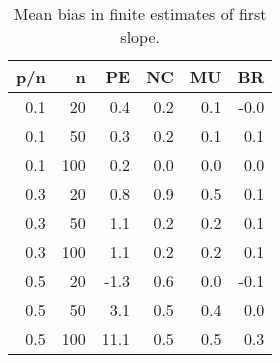 \begin{table}[ht]
\centering
\begin{tabular}{rrrrrr}
  \hline
p/n & n & PE & NC & MU & BR \\ 
  \hline
0.1 & 20 & 0.4 & 0.2 & 0.1 & -0.0 \\ 
  0.1 & 50 & 0.3 & 0.2 & 0.1 & 0.1 \\ 
  0.1 & 100 & 0.2 & 0.0 & 0.0 & 0.0 \\ 
  0.3 & 20 & 0.8 & 0.9 & 0.5 & 0.1 \\ 
  0.3 & 50 & 1.1 & 0.2 & 0.2 & 0.1 \\ 
  0.3 & 100 & 1.1 & 0.2 & 0.2 & 0.1 \\ 
  0.5 & 20 & -1.3 & 0.6 & 0.0 & -0.1 \\ 
  0.5 & 50 & 3.1 & 0.5 & 0.4 & 0.0 \\ 
  0.5 & 100 & 11.1 & 0.5 & 0.5 & 0.3 \\ 
   \hline
\end{tabular}
\caption{Mean bias in finite estimates of first slope.} 
\label{tab:binomialmoderatemissing}
\end{table}
